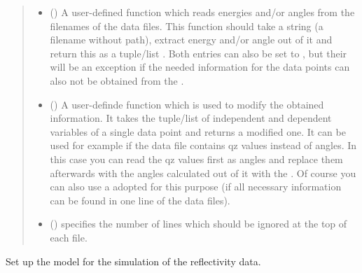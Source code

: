\documentclass[letterpaper,10pt,english]{sphinxmanual}
\begin{document}
\begin{fulllineitems}
\begin{fulllineitems}
\begin{quote}
\begin{description}
\begin{itemize}
\item {} 
 () \textendash{} A user-defined function which reads energies and/or angles from the filenames of the data files. This function should take a string (a filename without path), extract energy and/or angle out of it and return this as a tuple/list . Both entries can also be set to , but their will be an exception if the needed information for the data points can also not be obtained from the .

\item {} 
 () \textendash{} A user-definde function which is used to modify the obtained information. It takes the tuple/list of independent and dependent variables of a single data point and returns a modified one. It can be used for example if the data file contains qz values instead of angles. In this case you can read the qz values first as angles and replace them afterwards with the angles calculated out of it with the . Of course you can also use a adopted  for this purpose (if all necessary information can be found in one line of the data files).

\item {} 
 () \textendash{} specifies the number of lines which should be ignored at the top of each file.

\end{itemize}

\end{description}\end{quote}

\end{fulllineitems}


\begin{fulllineitems}
\label{\detokenize{modules-api/experiment:Experiment.ReflDataSimulator.setModel}}
Set up the model for the simulation of the reflectivity data.


\end{fulllineitems}
\end{fulllineitems}
\end{document}
